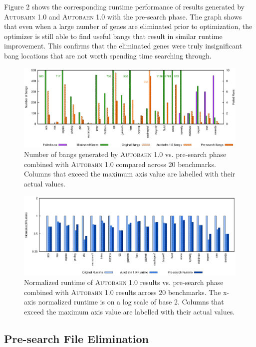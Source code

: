 \documentclass[format=sigplan, review=true]{acmart}
\newcommand{\useful}[0]{useful}
\newcommand{\Ao}[0]{\textsc{Autobahn 1.0}}
\newcommand{\preopt}[0]{pre-search}
\newcommand{\Preopt}[0]{Pre-search}
\begin{document}
Figure 2 shows the corresponding runtime performance of results generated by \Ao{} and \Ao{} with the \preopt{} phase. The graph shows that even when a large number of genes are eliminated prior to optimization, the optimizer is still able to find \useful{} bangs that result in similar runtime improvement. This confirms that the eliminated genes were truly insignificant bang locations that are not worth spending time searching through. 

\begin{figure}
\includegraphics[width=\textwidth]{pre-aut-bangs}
\caption{Number of bangs generated by \Ao{} vs. \preopt{} phase combined with \Ao{} compared across 20 benchmarks. Columns that exceed the maximum axis value are labelled with their actual values.}
\end{figure}

\begin{figure}
\includegraphics[width=\textwidth]{pre-aut}
\caption{Normalized runtime of \Ao{} results vs. \preopt{} phase combined with \Ao{} results across 20 benchmarks. The x-axis normalized runtime is on a log scale of base 2. Columns that exceed the maximum axis value are labelled with their actual values.}
\end{figure}

\subsection{\Preopt{} File Elimination}
\end{document}
